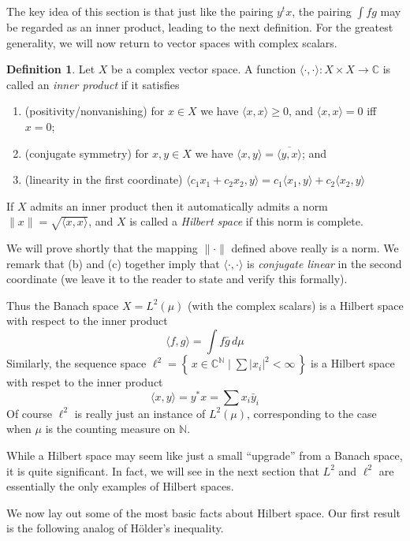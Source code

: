 \documentclass[11pt,oneside]{amsbook}
\newcommand{\set}[1]{\left\{\,#1\,\right\}}
\newcommand{\NN}{{\mathbb N}}
\newcommand{\CC}{{\mathbb C}}
\theoremstyle{definition}
\theoremstyle{plain}
\theoremstyle{definition}
\newtheorem{defn}[thm]{Definition}
\theoremstyle{remark}
\numberwithin{equation}{section}
\numberwithin{figure}{section}
\begin{document}
The key idea of this section is that just like the pairing $y^tx$, the pairing $\int fg$ may be regarded as an inner product, leading to the next definition. For the greatest generality, we will now return to vector spaces with complex scalars.

\begin{defn}
  Let $X$ be a complex vector space. A function $\langle\cdot,\cdot\rangle\colon X\times X\to\CC$ is called an \emph{inner product} if it satisfies
  \begin{enumerate}
  \item (positivity/nonvanishing) for $x\in X$ we have $\langle x,x\rangle\geq0$, and $\langle x,x\rangle=0$ iff $x=0$;
  \item (conjugate symmetry) for $x,y\in X$ we have $\langle x,y\rangle=\overline{\langle y,x\rangle}$; and
  \item (linearity in the first coordinate) $\langle c_1x_1+c_2x_2,y\rangle=c_1\langle x_1,y\rangle+c_2\langle x_2,y\rangle$
  \end{enumerate}
  If $X$ admits an inner product then it automatically admits a norm $\|x\|=\sqrt{\langle x,x\rangle}$, and $X$ is called a \emph{Hilbert space} if this norm is complete.
\end{defn}

We will prove shortly that the mapping $\|\cdot\|$ defined above really is a norm. We remark that (b) and (c) together imply that $\langle\cdot,\cdot\rangle$ is \emph{conjugate linear} in the second coordinate (we leave it to the reader to state and verify this formally).

Thus the Banach space $X=L^2(\mu)$ (with the complex scalars) is a Hilbert space with respect to the inner product
\[\langle f,g\rangle=\int f\bar g\,d\mu
\]
Similarly, the sequence space $\ell^2=\set{x\in\CC^\NN\mid\sum |x_i|^2<\infty}$ is a Hilbert space with respet to the inner product
\[\langle x,y\rangle=y^*x=\sum x_i\bar{y}_i
\]
Of course $\ell^2$ is really just an instance of $L^2(\mu)$, corresponding to the case when $\mu$ is the counting measure on $\NN$.

While a Hilbert space may seem like just a small ``upgrade'' from a Banach space, it is quite significant. In fact, we will see in the next section that $L^2$ and $\ell^2$ are essentially the only examples of Hilbert spaces.

We now lay out some of the most basic facts about Hilbert space. Our first result is the following analog of H\"older's inequality.
\end{document}
